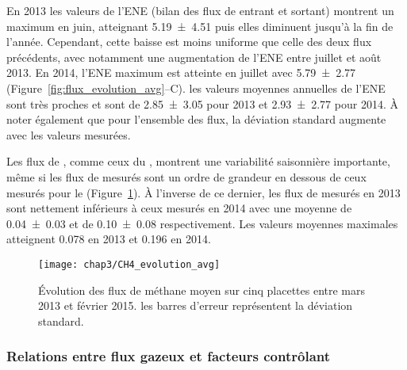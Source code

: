 En 2013 les valeurs de l'ENE (bilan des flux de \coo entrant et sortant) montrent un maximum en juin, atteignant \SI{5.19(451)}{\uml} puis elles diminuent jusqu'à la fin de l'année.
Cependant, cette baisse est moins uniforme que celle des deux flux précédents, avec notamment une augmentation de l'ENE entre juillet et août 2013.
En 2014, l'ENE maximum est atteinte en juillet avec \SI{5.79(277)}{\uml} (Figure~\ref{fig:flux_evolution_avg}--C).
les valeurs moyennes annuelles de l'ENE sont très proches et sont de \SI{2.85(305)}{\uml} pour 2013 et \SI{2.93(277)}{\uml} pour 2014.
À noter également que pour l'ensemble des flux, la déviation standard augmente avec les valeurs mesurées.


Les flux de \chh, comme ceux du \coo, montrent une variabilité saisonnière importante, même si les flux de \chh mesurés sont un ordre de grandeur en dessous de ceux mesurés pour le \coo (Figure~\ref{fig:CH4_evolution_avg}).
À l'inverse de ce dernier, les flux de \chh mesurés en 2013 sont nettement inférieurs à ceux mesurés en 2014 avec une moyenne de \num{0.04(003)} et de \SI{0.10(008)}{\uml} respectivement.
Les valeurs moyennes maximales atteignent \num{0.078} en 2013 et \SI{0.196}{\uml} en 2014.

\begin{figure}
\centering
\texttt{[image: chap3/CH4\_evolution\_avg]}
\caption{Évolution des flux de méthane moyen sur cinq placettes entre mars 2013 et février 2015. les barres d'erreur représentent la déviation standard.}
\label{fig:CH4_evolution_avg}
\end{figure}



\subsubsection{Relations entre flux gazeux et facteurs contrôlant}

